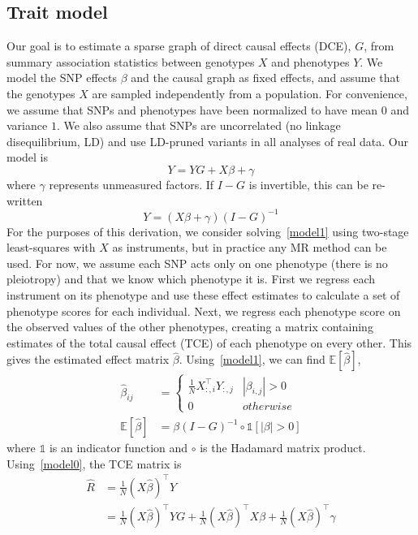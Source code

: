\documentclass{article}
\begin{document}
\subsection{Trait model}
Our goal is to estimate a sparse graph of direct causal effects (DCE), $G$, from
summary association statistics between genotypes $X$ and phenotypes $Y$. We model
the SNP effects $\beta$ and the causal graph as fixed effects, and assume that the genotypes
$X$ are sampled independently from a population. For convenience, we assume that SNPs
 and phenotypes have been normalized
 to have mean $0$ and variance $1$. We also assume that SNPs are uncorrelated (no linkage disequilibrium, LD)
and use LD-pruned variants in all analyses of real data.
Our model is
\begin{equation}\label{model0}
 Y = Y G + X \beta + \gamma
\end{equation}
where $\gamma$ represents unmeasured factors. If $I - G$ is invertible, this can be re-written
\begin{equation}\label{model1}
Y = (X \beta + \gamma)(I - G)^{-1}
\end{equation}
For the purposes of this derivation, we consider solving~\eqref{model1}
using two-stage least-squares with $X$ as instruments, but in practice any MR method can be used.
For now, we assume each SNP acts only on one phenotype
(there is no pleiotropy) and that we know which phenotype it is.
First we regress each instrument on its phenotype and use these effect
 estimates to calculate a set of phenotype scores for each individual.
Next, we regress each phenotype score on the observed values of the other phenotypes,
 creating a matrix containing estimates of the total causal effect (TCE) of
 each phenotype on every other. This gives the estimated effect matrix $\hat{\beta}$.
Using~\eqref{model1}, we can find $\mathbb{E}[\hat{\beta} ]$,
\begin{align*}
\hat{\beta}_{ij} &= \left\{
 \begin{array}{ll}
  \frac{1}{N} X_{:, i}^{\top}Y_{:,j} & |\beta_{i,j}| > 0 \\
  0 & otherwise
 \end{array} \right. \\
 \mathbb{E}[\hat{\beta} ] &= \beta (I-G)^{-1} \circ \mathds{1}[|\beta| > 0]
\end{align*}
where $\mathds{1}$ is an indicator function and $\circ$ is the Hadamard matrix
product. Using~\eqref{model0}, the TCE matrix is
\begin{align*}
\hat{R} &= \frac{1}{N} (X\hat{\beta})^{\top} Y \\
  &= \frac{1}{N} (X\hat{\beta})^{\top} Y G + \frac{1}{N}(X\hat{\beta})^{\top} X \beta +
     \frac{1}{N}(X\hat{\beta})^{\top} \gamma
  \end{align*}
\end{document}
